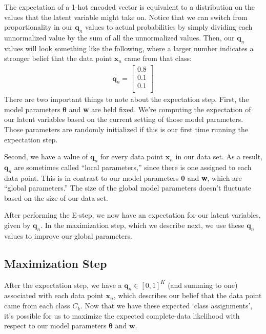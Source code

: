 The expectation of a 1-hot encoded vector is equivalent to a distribution on the values that the latent variable might take on.
Notice that we can switch from proportionality in our $\textbf{q}_n$ values to actual probabilities by simply dividing each unnormalized value by the sum of all the unnormalized values. Then, our $\textbf{q}_n$ values will look something like the following, where a larger number indicates a stronger belief that the data point $\textbf{x}_n$ came from that class:
\begin{align*}
    \textbf{q}_n = \begin{bmatrix}
            0.8 \\
            0.1 \\
            0.1 \\
        \end{bmatrix}
\end{align*}
There are two important things to note about the expectation step. First, the model parameters $\boldsymbol{\theta}$ and \textbf{w} are held fixed. We're computing the expectation of our latent variables based on the current setting of those model parameters. Those parameters are randomly initialized if this is our first time running the expectation step.

Second, we have a value of $\textbf{q}_n$ for every data point $\textbf{x}_n$ in our data set. As a result, $\textbf{q}_n$ are sometimes called ``local parameters,'' since there is one assigned to each data point. This is in contrast to our model parameters $\boldsymbol{\theta}$ and \textbf{w}, which are ``global parameters.'' The size of the global model parameters doesn't fluctuate based on the size of our data set.

After performing the E-step, we now have an expectation for our latent variables, given by $\textbf{q}_n$. In the maximization step, which we describe next, we use these $\textbf{q}_n$ values to improve our global parameters.

\subsection{Maximization Step}

After the expectation step, we have a $\textbf{q}_n \in [0,1]^K$ (and summing to one) associated with each data point $\textbf{x}_n$, which describes our belief that the data point came from each class $C_k$. Now that we have these expected `class assignments', it's possible for us to maximize the expected complete-data likelihood with respect to our model parameters $\boldsymbol{\theta}$ and $\textbf{w}$.

